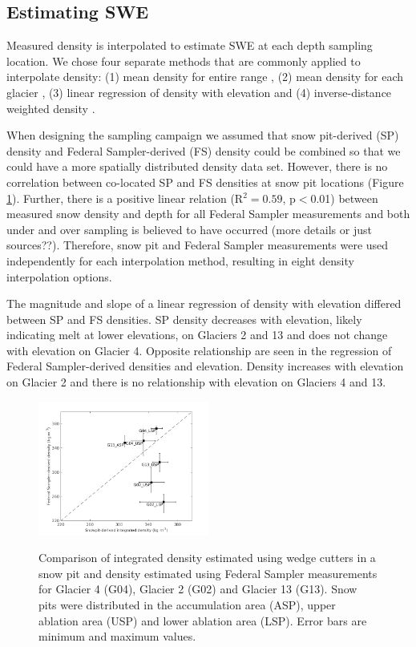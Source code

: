 \documentclass[twocolumn,letterpaper]{igs}
\begin{document}
\subsection{Estimating SWE}

Measured density is interpolated to estimate SWE at each depth sampling location. We chose four separate methods that are commonly applied to interpolate density: (1) mean density for entire range \citep{Cullen2017}, (2) mean density for each glacier \citep{Elder1991, McGrath2015}, (3) linear regression of density with elevation \citep{Elder1998, Molotch2005} and (4) inverse-distance weighted density \citep{Molotch2005}. 

When designing the sampling campaign we assumed that snow pit-derived (SP) density and Federal Sampler-derived (FS) density could be combined so that we could have a more spatially distributed density data set. However, there is no correlation between co-located SP and FS densities at snow pit locations (Figure \ref{fig:density_pitVStube}). Further, there is a positive linear relation (R$^2= 0.59$, p$<$0.01) between measured snow density
and depth for all Federal Sampler measurements and both under and over sampling is believed to have occurred (more details or just sources??). Therefore, snow pit and Federal Sampler measurements were used independently for each interpolation method, resulting in eight density interpolation options. 

The magnitude and slope of a linear regression of density with elevation differed between
SP and FS densities. SP density decreases with elevation, likely indicating melt at lower elevations, on Glaciers 2 and 13 and does not change with elevation on Glacier 4. Opposite relationship are seen in the regression of Federal Sampler-derived densities and elevation. Density increases with elevation on Glacier 2 and there is no relationship with elevation on Glaciers 4 and 13. 

\begin{figure}
	\centering
	\includegraphics[width =0.5\textwidth]{SnowpitVsSWEtube_all.png}\\
	\caption{Comparison of integrated density estimated using wedge cutters in a snow pit and density estimated using Federal Sampler measurements for Glacier 4 (G04), Glacier 2 (G02) and Glacier 13 (G13). Snow pits were distributed in the accumulation area (ASP), upper ablation area (USP) and lower ablation area (LSP). Error bars are minimum and maximum values.}
	\label{fig:density_pitVStube}
\end{figure}
\end{document}
